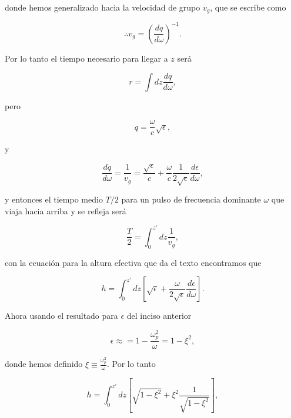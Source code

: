\documentclass[a4paper,11pt]{article}
\numberwithin{equation}{section}
\begin{document}
donde hemos generalizado hacia la velocidad de grupo $v_g$, que se escribe como 

\begin{equation}
 \therefore v_g = \left(\frac{dq}{d\omega}\right)^{-1}.
\end{equation}

Por lo tanto el tiempo necesario para llegar a $z$ será 

\begin{equation}
 r = \int dz \frac{dq}{d\omega},
\end{equation}

pero 

\begin{equation}
 q = \frac{\omega}{c}\sqrt{\epsilon},
\end{equation}

y

\begin{equation}
 \frac{dq}{d\omega} = \frac{1}{v_g} = \frac{\sqrt{\epsilon}}{c} + \frac{\omega}{c} 
 \frac{1}{2\sqrt{\epsilon}} \frac{d\epsilon}{d\omega},
\end{equation}

y entonces el tiempo medio $T/2$ para un pulso de frecuencia dominante $\omega$ que
viaja hacia arriba y se refleja será 

\begin{equation}
 \frac{T}{2} = \int_0^{z'} dz \frac{1}{v_g},
\end{equation}

con la ecuación para la altura efectiva que da el texto encontramos que 

\begin{equation}
 h = \int_0^{z'} dz \left[\sqrt{\epsilon} + \frac{\omega}{2\sqrt{\epsilon}} 
 \frac{d\epsilon}{d\omega}\right].
\end{equation}

Ahora usando el resultado para $\epsilon$ del inciso anterior 

\begin{equation}
 \epsilon \approx = 1 - \frac{\omega_p^2}{\omega} = 1 - \xi^2,
\end{equation}

donde hemos definido $\xi \equiv \frac{\omega_p^2}{\omega}$. Por lo tanto 

\begin{equation}
 h = \int_0^{z'} dz \left[\sqrt{1 - \xi^2} + \xi^2 \frac{1}{\sqrt{1 - \xi^2}} \right],
\end{equation}
\end{document}
